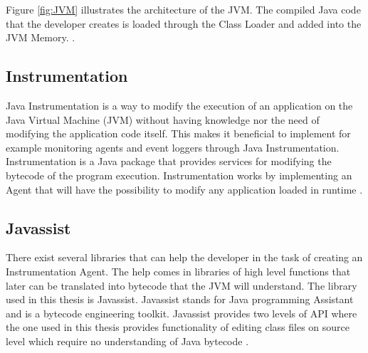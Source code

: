 Figure \ref{fig:JVM} illustrates the architecture of the JVM. The compiled Java code that the developer creates is loaded through the Class Loader and added into the JVM Memory. \parencite{venners_1999}.


\subsection{Instrumentation}
Java Instrumentation is a way to modify the execution of an application on the Java Virtual Machine (JVM) without having knowledge nor the need of modifying the application code itself. This makes it beneficial to implement for example monitoring agents and event loggers through Java Instrumentation. Instrumentation is a Java package that provides services for modifying the bytecode of the program execution. Instrumentation works by implementing an Agent that will have the possibility to modify any application loaded in runtime \parencite{Java_Instrument}.


\subsection{Javassist}
There exist several libraries that can help the developer in the task of creating an Instrumentation Agent. The help comes in libraries of high level functions that later can be translated into bytecode that the JVM will understand. The library used in this thesis is Javassist. Javassist stands for Java programming Assistant and is a bytecode engineering toolkit. Javassist provides two levels of API where the one used in this thesis provides functionality of editing class files on source level which require no understanding of Java bytecode \parencite{Javassist}.